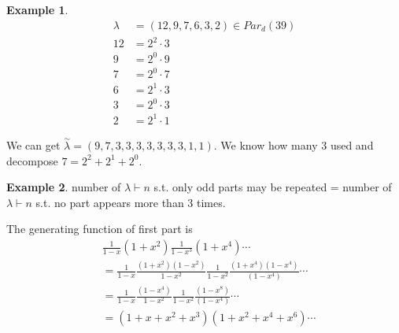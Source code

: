 \documentclass{article}
\theoremstyle{definition}
\newtheorem{ex}{Example}[]
\begin{document}
\begin{ex}
    \begin{align*}
        \lambda &= ( 12 , 9, 7, 6, 3, 2) \in {Par}_d (39) \\ 
        12 &= 2^2 \cdot 3 \\ 
        9 &= 2^0 \cdot 9 \\ 
        7 &= 2^0 \cdot 7 \\ 
        6 &= 2^1 \cdot 3 \\
        3 &= 2^0 \cdot 3 \\ 
        2 &= 2^1 \cdot 1
    \end{align*}
\end{ex}
We can get $\overset{\sim}{\lambda} = ( 9, 7, 3, 3, 3, 3, 3, 3, 3, 1, 1)$. 
We know how many 3 used and decompose $7 = 2^2 + 2^1 + 2^0$. 
\begin{ex}
    number of $\lambda \vdash n$ s.t. only odd parts may be repeated 
    = number of $\lambda \vdash n$ s.t. no part appears more than 3 times.
\end{ex}
The generating function of first part is 
\begin{align*}
    &\frac{1}{1-x} (1+x^2) \frac{1}{1-x^3} (1+x^4) \cdots  \\ 
    &= \frac{1}{1-x} \frac{(1+x^2)(1-x^2)}{1-x^2} \frac{1}{1-x^2} 
    \frac{(1+x^4)(1-x^4)}{(1-x^4)} \cdots \\
    &= \frac{1}{1-x} \frac{(1-x^4)}{1-x^2} \frac{1}{1-x^2} 
    \frac{(1-x^8)}{(1-x^4)} \cdots \\ 
    &= (1+x + x^2 + x^3)(1+ x^2 +x^4 +x^6) \cdots 
\end{align*}
\end{document}
